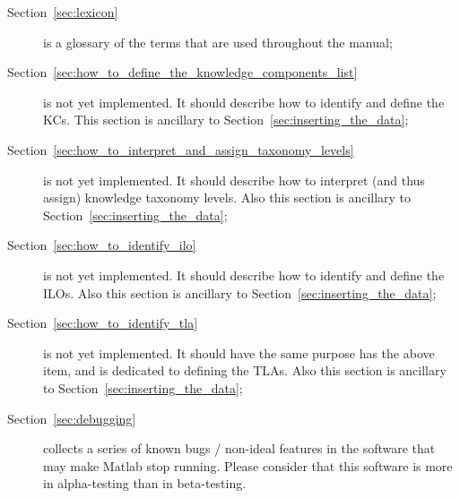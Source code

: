\begin{description}

\item[Section~\ref{sec:lexicon}] is a glossary of the terms that are used
	throughout the manual; 

\item[Section~\ref{sec:how_to_define_the_knowledge_components_list}] is not
	yet implemented. It should describe how to identify and define the
	\acp{KC}. This section is ancillary to
	Section~\ref{sec:inserting_the_data};

\item[Section~\ref{sec:how_to_interpret_and_assign_taxonomy_levels}] is not
	yet implemented. It should describe how to interpret (and thus
	assign) knowledge taxonomy levels. Also this section is
	ancillary to Section~\ref{sec:inserting_the_data};

\item[Section~\ref{sec:how_to_identify_ilo}] is not yet implemented. It
	should describe how to identify and define the \acp{ILO}. Also this
	section is ancillary to
	Section~\ref{sec:inserting_the_data};

\item[Section~\ref{sec:how_to_identify_tla}] is not yet implemented. It
	should have the same purpose has the above item, and is dedicated to
	defining the \acp{TLA}. Also this section is ancillary to
	Section~\ref{sec:inserting_the_data};

\item[Section~\ref{sec:debugging}] collects a series of known bugs /
	non-ideal features in the software that may make Matlab stop
	running. Please consider that this software is more in
	alpha-testing than in beta-testing.

\end{description}

